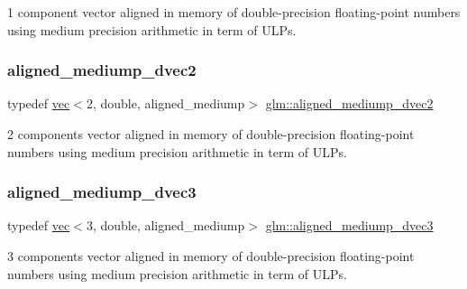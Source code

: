 1 component vector aligned in memory of double-\/precision floating-\/point numbers using medium precision arithmetic in term of U\+L\+Ps. 

\mbox{\label{group__gtc__type__aligned_gab67579d5dcc90f9e4ab28cc92a467eee}} 
\subsubsection{\texorpdfstring{aligned\+\_\+mediump\+\_\+dvec2}{aligned\_mediump\_dvec2}}
{\footnotesize\ttfamily typedef \mbox{\hyperlink{structglm_1_1vec}{vec}}$<$2, double, aligned\+\_\+mediump$>$ \mbox{\hyperlink{group__gtc__type__aligned_gab67579d5dcc90f9e4ab28cc92a467eee}{glm\+::aligned\+\_\+mediump\+\_\+dvec2}}}



2 components vector aligned in memory of double-\/precision floating-\/point numbers using medium precision arithmetic in term of U\+L\+Ps. 

\mbox{\label{group__gtc__type__aligned_gacd6fc80d8b9b4322560c9c27927da5e5}} 
\subsubsection{\texorpdfstring{aligned\+\_\+mediump\+\_\+dvec3}{aligned\_mediump\_dvec3}}
{\footnotesize\ttfamily typedef \mbox{\hyperlink{structglm_1_1vec}{vec}}$<$3, double, aligned\+\_\+mediump$>$ \mbox{\hyperlink{group__gtc__type__aligned_gacd6fc80d8b9b4322560c9c27927da5e5}{glm\+::aligned\+\_\+mediump\+\_\+dvec3}}}



3 components vector aligned in memory of double-\/precision floating-\/point numbers using medium precision arithmetic in term of U\+L\+Ps. 

